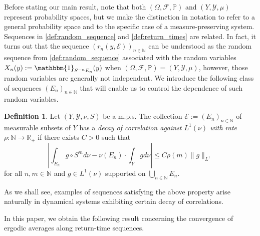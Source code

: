 \documentclass[11pt]{amsart}
\numberwithin{equation}{section}
\theoremstyle{definition}
\newtheorem{definition}[lemma]{Definition}
\theoremstyle{plain}
\newcommand{\N}{{\mathbb N}}
\begin{document}
Before stating our main result, note that both $(\Omega,\mathcal{F},\mathbb{P})$ and $(Y,\mathcal{Y},\mu)$ represent probability spaces, but we make the distinction in notation to refer to a general probability space and to the specific case of a measure-preserving system.  Sequences in \cref{def:random_sequence} and \cref{def:return_times} are related. In fact, it turns out that the sequence $(r_n(y,\mathcal{E}))_{n\in \N}$ can be understood as the random sequence from \cref{def:random_sequence} associated with the random variables $X_n(y):=\mathbbm{1}_{S^{-n}E_n}(y)$ when $(\Omega,\mathcal{F},\mathbb{P})=(Y,\mathcal{Y},\mu)$, however, those random variables are generally not independent. We introduce the following class of sequences $(E_n)_{n\in\N}$ that will enable us to control the dependence of such random variables.
\begin{definition}
Let $(Y,\mathcal{Y},\nu,S)$ be a m.p.s. The collection $\mathcal{E}:=(E_n)_{n\in \N}$ of measurable subsets of $Y$ has a \emph{decay of correlation against $L^1(\nu)$ with rate $\rho\colon\N\to \mathbb{R}_{+}$} if there exists $C>0$ such that
    \[\left|\int_{E_n} g\circ S^md\nu-\nu(E_n) \cdot \int_Y gd\nu \right|\leq C\rho(m)\|g\|_{L^{1}}\]
    for all $n,m\in\N$ and $g\in L^1(\nu)$ supported on $\bigcup_{n\in\N}E_n$. \label{def:correlations}
\end{definition} As we shall see, examples of sequences satisfying the above property arise naturally in dynamical systems exhibiting certain decay of correlations.
\medskip

In this paper, we obtain the following result concerning the convergence of ergodic averages along return-time sequences. 
\end{document}
